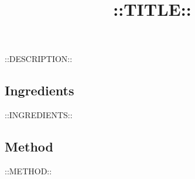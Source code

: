 \documentclass[a4paper,11pt]{article}
\title{%
::TITLE::
}
\begin{document}
\maketitle

::DESCRIPTION::

\subsection*{Ingredients}
\begin{itemize}
::INGREDIENTS::
\end{itemize}

\subsection*{Method}
\begin{enumerate}
::METHOD::
\end{enumerate}
\end{document}
